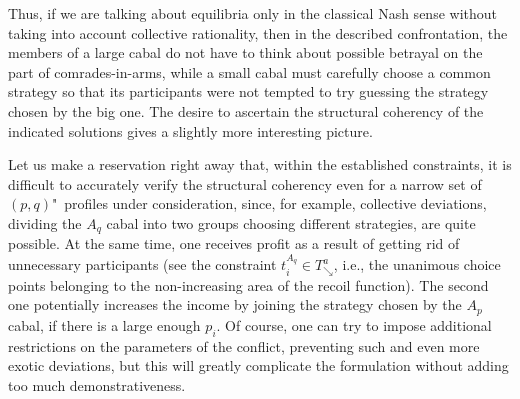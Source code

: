 Thus, if we are talking about equilibria only in the classical Nash sense without taking into account collective rationality, then in the described confrontation, the members of a large cabal do not have to think about possible betrayal on the part of comrades-in-arms, while a small cabal must carefully choose a common strategy so that its participants were not tempted to try guessing the strategy chosen by the big one. The desire to ascertain the structural coherency of the indicated solutions gives a slightly more interesting picture. %

Let us make a reservation right away that, within the established constraints, it is difficult to accurately verify the structural coherency even for a narrow set of $(p, q)$"~profiles under consideration, since, for example, collective deviations, dividing the $A_q$ cabal into two groups choosing different strategies, are quite possible. At the same time, one receives profit as a result of getting rid of unnecessary participants (see the constraint $t_i^{A_q} \in T^a_{\searrow}$, i.e., the unanimous choice points belonging to the non-increasing area of ​​the recoil function). The second one potentially increases the income by joining the strategy chosen by the $A_p$ cabal, if there is a large enough $p_i$. Of course, one can try to impose additional restrictions on the parameters of the conflict, preventing such and even more exotic deviations, but this will greatly complicate the formulation without adding too much demonstrativeness. %

